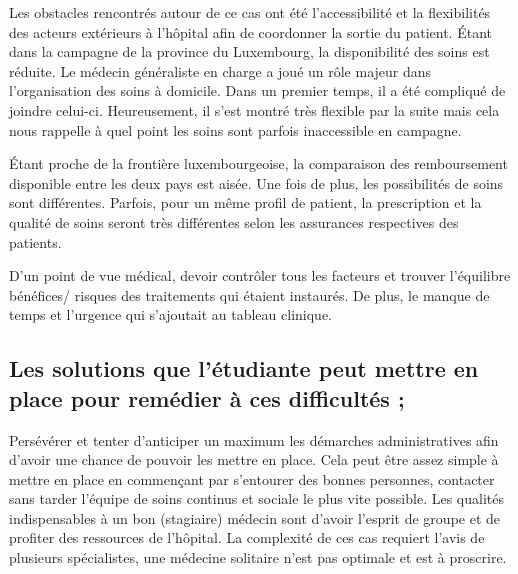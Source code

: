 Les obstacles rencontrés autour de ce cas ont été l’accessibilité et la flexibilités des acteurs extérieurs à l’hôpital afin de coordonner la sortie du patient. Étant dans la campagne de la province du Luxembourg, la disponibilité des soins est réduite. Le médecin généraliste en charge a joué un rôle majeur dans l’organisation des soins à domicile. Dans un premier temps, il a été compliqué de joindre celui-ci. Heureusement, il s’est montré très flexible par la suite mais cela nous rappelle à quel point les soins sont parfois inaccessible en campagne.

Étant proche de la frontière luxembourgeoise,  la comparaison des remboursement disponible entre les deux pays est aisée. Une fois de plus, les possibilités de soins sont différentes. Parfois, pour un même profil de patient, la prescription et la qualité de soins seront très différentes selon les assurances respectives des patients.

D’un point de vue médical, devoir contrôler tous les facteurs et trouver l’équilibre bénéfices/ risques des traitements qui étaient instaurés. De plus, le manque de temps et l’urgence qui s’ajoutait au tableau clinique. 

\subsection{Les solutions que l’étudiante peut mettre en place pour remédier à ces difficultés ;}

Persévérer et tenter d’anticiper un maximum les démarches administratives afin d’avoir une chance de pouvoir les mettre en place. Cela peut être assez simple à mettre en place en commençant par s’entourer des bonnes personnes, contacter sans tarder l’équipe de soins continus et sociale le plus vite possible. Les qualités indispensables à un bon (stagiaire) médecin sont d’avoir l’esprit de groupe et de profiter des ressources de l’hôpital. La complexité de ces cas requiert l’avis de plusieurs spécialistes, une médecine solitaire n’est pas optimale et est à proscrire. 
